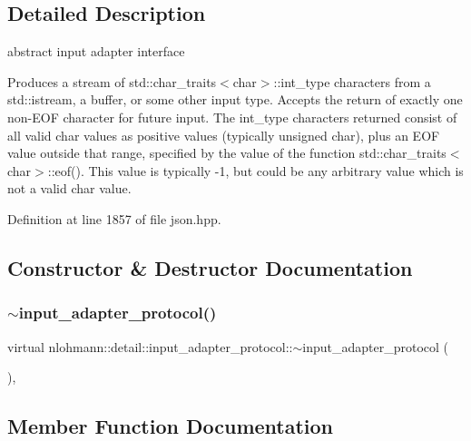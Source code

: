 \subsection{Detailed Description}
abstract input adapter interface 

Produces a stream of std\+::char\+\_\+traits$<$char$>$\+::int\+\_\+type characters from a std\+::istream, a buffer, or some other input type. Accepts the return of exactly one non-\/\+E\+OF character for future input. The int\+\_\+type characters returned consist of all valid char values as positive values (typically unsigned char), plus an E\+OF value outside that range, specified by the value of the function std\+::char\+\_\+traits$<$char$>$\+::eof(). This value is typically -\/1, but could be any arbitrary value which is not a valid char value. 

Definition at line 1857 of file json.\+hpp.



\subsection{Constructor \& Destructor Documentation}
\mbox{\label{structnlohmann_1_1detail_1_1input__adapter__protocol_a92dac74def4ac5adacd0684088bd4082}} 
\subsubsection{\texorpdfstring{$\sim$input\+\_\+adapter\+\_\+protocol()}{~input\_adapter\_protocol()}}
{\footnotesize\ttfamily virtual nlohmann\+::detail\+::input\+\_\+adapter\+\_\+protocol\+::$\sim$input\+\_\+adapter\+\_\+protocol (\begin{DoxyParamCaption}{ }\end{DoxyParamCaption})\hspace{0.3cm}{\ttfamily [virtual]}, {\ttfamily [default]}}



\subsection{Member Function Documentation}
\mbox{\label{structnlohmann_1_1detail_1_1input__adapter__protocol_aac10a6a4048a8ce8e2ed50277692a3ca}} 
